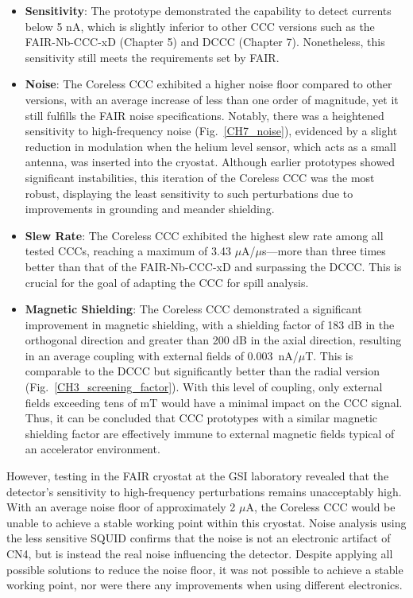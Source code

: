 \documentclass[12pt,a4paper]{report}
\begin{document}
	\begin{itemize}
		\item \textbf{Sensitivity}: The prototype demonstrated the capability to detect currents below 5 nA, which is slightly inferior to other CCC versions such as the FAIR-Nb-CCC-xD (Chapter 5) and DCCC (Chapter 7). Nonetheless, this sensitivity still meets the requirements set by FAIR.
		
		\item \textbf{Noise}: The Coreless CCC exhibited a higher noise floor compared to other versions, with an average increase of less than one order of magnitude, yet it still fulfills the FAIR noise specifications. Notably, there was a heightened sensitivity to high-frequency noise (Fig.~\ref{CH7_noise}), evidenced by a slight reduction in modulation when the helium level sensor, which acts as a small antenna, was inserted into the cryostat. Although earlier prototypes showed significant instabilities, this iteration of the Coreless CCC was the most robust, displaying the least sensitivity to such perturbations due to improvements in grounding and meander shielding.
		
		\item \textbf{Slew Rate}: The Coreless CCC exhibited the highest slew rate among all tested CCCs, reaching a maximum of 3.43 $\mu$A/$\mu$s—more than three times better than that of the FAIR-Nb-CCC-xD and surpassing the DCCC. This is crucial for the goal of adapting the CCC for spill analysis.
		
		\item \textbf{Magnetic Shielding}: The Coreless CCC demonstrated a significant improvement in magnetic shielding, with a shielding factor of 183 dB in the orthogonal direction and greater than 200 dB in the axial direction, resulting in an average coupling with external fields of 0.003~nA/$\mu$T. This is comparable to the DCCC but significantly better than the radial version (Fig.~\ref{CH3_screening_factor}). With this level of coupling, only external fields exceeding tens of mT would have a minimal impact on the CCC signal. Thus, it can be concluded that CCC prototypes with a similar magnetic shielding factor are effectively immune to external magnetic fields typical of an accelerator environment.
	\end{itemize}
	
	However, testing in the FAIR cryostat at the GSI laboratory revealed that the detector's sensitivity to high-frequency perturbations remains unacceptably high. With an average noise floor of approximately 2 $\mu$A, the Coreless CCC would be unable to achieve a stable working point within this cryostat. Noise analysis using the less sensitive SQUID confirms that the noise is not an electronic artifact of CN4, but is instead the real noise influencing the detector. Despite applying all possible solutions to reduce the noise floor, it was not possible to achieve a stable working point, nor were there any improvements when using different electronics.
	
\end{document}
